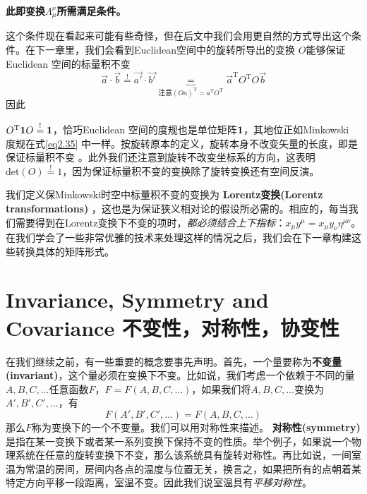 {\bf{此即变换$\Lambda_\mu^\nu$所需满足条件。}}

这个条件现在看起来可能有些奇怪，但在后文中我们会用更自然的方式导出这个条件。在下一章里，我们会看到Euclidean空间中的旋转所导出的变换
$O$能够保证Euclidean 空间的标量积不变%
\begin{equation}\label{eq2.36}
  \vec{a} \cdot \vec{b}
  \overset{\text{!}}{=}
  \vec{a'} \cdot \vec{b'}
  \!\!\!\!\!\!\!\!\!\!
  \underbrace{=}_{\text{注意}
  (Oa)^\mathrm{T}=a^\mathrm{T}O^\mathrm{T}}
  \!\!\!\!\!\!\!\!\!\!
  \vec{a}^\mathrm{T} O^\mathrm{T} O\vec{b}
\end{equation}
因此

$O^\mathrm{T} {\bf{1}} O\overset{\text{!}}{=}{\bf{1}}$，恰巧Euclidean 空间的度规也是单位矩阵${\bf{1}}$，其地位正如Minkowski 度规在式\ref{eq2.35} 中一样。按旋转原本的定义，旋转本身不改变矢量的长度，即是保证标量积不变
。此外我们还注意到旋转不改变坐标系的方向，这表明 $\text{det}(O) \overset{\text{!}}{=}1$，因为保证标量积不变的变换除了旋转变换还有空间反演。

我们定义保Minkowski时空中标量积不变的变换为
{\bf{Lorentz变换(Lo\-rentz transformations)}}
，这也是为保证狭义相对论的假设所必需的。相应的，每当我们需要得到在Lorentz变换下不变的项时，{\it{都必须结合上下指标}}：$x_\mu y^\mu=x_\mu y_\nu \eta^{\mu\nu}$。
在我们学会了一些非常优雅的技术来处理这样的情况之后，我们会在下一章构建这些转换具体的矩阵形式。
\section[不变性，对称性，协变性]{Invariance, Symmetry and Covariance 不变性，对称性，协变性}
在我们继续之前，有一些重要的概念要事先声明。首先，一个量要称为{\bf{不变量(invariant)}}，这个量必须在变换下不变。比如说，我们考虑一个依赖于不同的量$A,B,C,\dots$任意函数$ F$，$F=F(A,B,C,\dots)$，如果我们将$A,B,C,\dots$变换为$A',B',C',\dots$，有
\begin{equation}\label{eq2.37}
  F(A',B',C',\dots)=F(A,B,C,\dots)
\end{equation}
那么$F$称为变换下的一个不变量。我们可以用对称性来描述。
{\bf{对称性(symmetry)}}是指在某一变换下或者某一系列变换下保持不变的性质。举个例子，如果说一个物理系统在任意的旋转变换下不变，那么该系统具有旋转对称性。再比如说，一间室温为常温的房间，房间内各点的温度与位置无关，换言之，如果把所有的点朝着某特定方向平移一段距离，室温不变。因此我们说室温具有{\it{平移对称性}}。%

